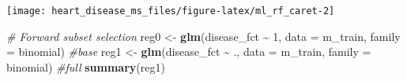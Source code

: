 \documentclass[
]{article}
\newenvironment{Shaded}{\begin{snugshade}}{\end{snugshade}}
\newcommand{\AttributeTok}[1]{\textcolor[rgb]{0.13,0.29,0.53}{#1}}
\newcommand{\CommentTok}[1]{\textcolor[rgb]{0.56,0.35,0.01}{\textit{#1}}}
\newcommand{\DecValTok}[1]{\textcolor[rgb]{0.00,0.00,0.81}{#1}}
\newcommand{\FunctionTok}[1]{\textcolor[rgb]{0.13,0.29,0.53}{\textbf{#1}}}
\newcommand{\NormalTok}[1]{#1}
\newcommand{\OtherTok}[1]{\textcolor[rgb]{0.56,0.35,0.01}{#1}}
\newcommand{\SpecialCharTok}[1]{\textcolor[rgb]{0.81,0.36,0.00}{\textbf{#1}}}
\begin{document}
\begin{Shaded}
\end{Shaded}

\begin{center}\texttt{[image: heart\_disease\_ms\_files/figure-latex/ml\_rf\_caret-2]} \end{center}

\begin{Shaded}
\begin{Highlighting}[]
\CommentTok{\# Forward subset selection}
\NormalTok{reg0 }\OtherTok{\textless{}{-}} \FunctionTok{glm}\NormalTok{(disease\_fct }\SpecialCharTok{\textasciitilde{}} \DecValTok{1}\NormalTok{, }\AttributeTok{data =}\NormalTok{ m\_train, }\AttributeTok{family =}\NormalTok{ binomial) }\CommentTok{\#base}
\NormalTok{reg1 }\OtherTok{\textless{}{-}} \FunctionTok{glm}\NormalTok{(disease\_fct }\SpecialCharTok{\textasciitilde{}}\NormalTok{ ., }\AttributeTok{data =}\NormalTok{ m\_train, }\AttributeTok{family =}\NormalTok{ binomial) }\CommentTok{\#full}
\FunctionTok{summary}\NormalTok{(reg1)}
\end{Highlighting}
\end{Shaded}
\end{document}
